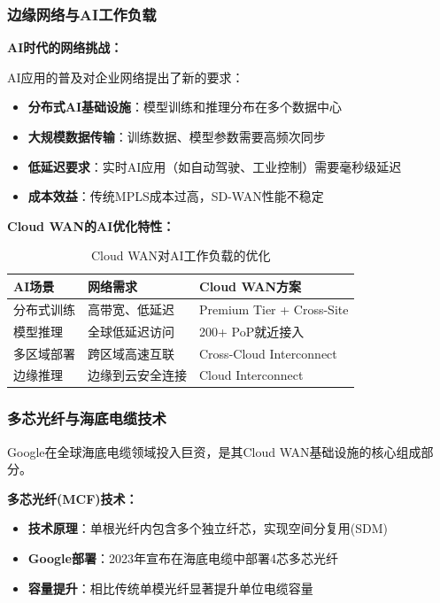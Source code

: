 \subsubsection{边缘网络与AI工作负载}

\textbf{AI时代的网络挑战：}

AI应用的普及对企业网络提出了新的要求：
\begin{itemize}
    \item \textbf{分布式AI基础设施}：模型训练和推理分布在多个数据中心
    \item \textbf{大规模数据传输}：训练数据、模型参数需要高频次同步
    \item \textbf{低延迟要求}：实时AI应用（如自动驾驶、工业控制）需要毫秒级延迟
    \item \textbf{成本效益}：传统MPLS成本过高，SD-WAN性能不稳定
\end{itemize}

\textbf{Cloud WAN的AI优化特性：}

\begin{table}[htbp]
\centering
\caption{Cloud WAN对AI工作负载的优化}
\begin{tabular}{|l|l|l|}
\hline
\textbf{AI场景} & \textbf{网络需求} & \textbf{Cloud WAN方案} \\
\hline
分布式训练 & 高带宽、低延迟 & Premium Tier + Cross-Site \\
模型推理 & 全球低延迟访问 & 200+ PoP就近接入 \\
多区域部署 & 跨区域高速互联 & Cross-Cloud Interconnect \\
边缘推理 & 边缘到云安全连接 & Cloud Interconnect \\
\hline
\end{tabular}
\end{table}

\subsubsection{多芯光纤与海底电缆技术}

Google在全球海底电缆领域投入巨资，是其Cloud WAN基础设施的核心组成部分。

\textbf{多芯光纤(MCF)技术：}

\begin{itemize}
    \item \textbf{技术原理}：单根光纤内包含多个独立纤芯，实现空间分复用(SDM)
    \item \textbf{Google部署}：2023年宣布在海底电缆中部署4芯多芯光纤
    \item \textbf{容量提升}：相比传统单模光纤显著提升单位电缆容量
\end{itemize}

